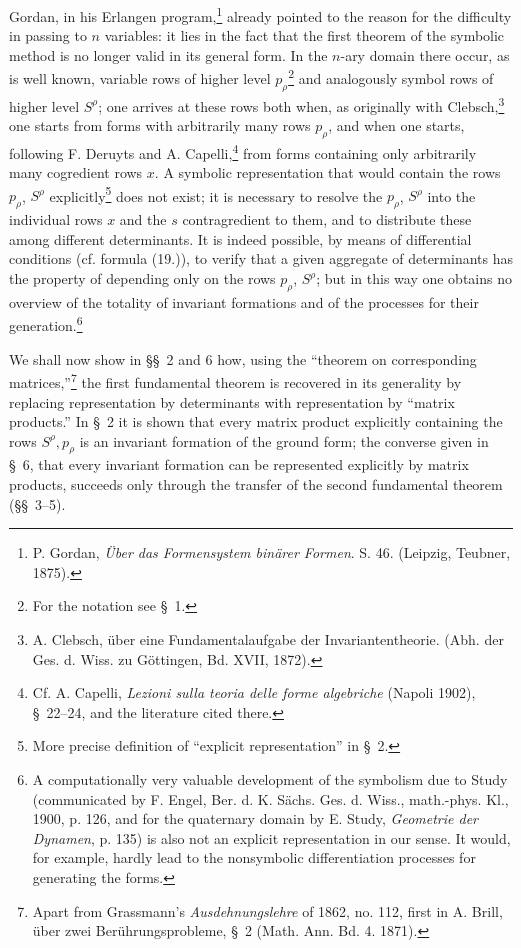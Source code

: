 \documentclass[11pt]{article}
\begin{document}
Gordan, in his Erlangen program,\footnote{P. Gordan, \emph{Über das Formensystem binärer Formen}. S. 46. (Leipzig, Teubner, 1875).} already pointed to the reason for the difficulty in passing to $n$ variables: it lies in the fact that the first theorem of the symbolic method is no longer valid in its general form. In the $n$-ary domain there occur, as is well known, variable rows of higher level $p_\rho$\footnote{For the notation see \S\ 1.} and analogously symbol rows of higher level $S^\rho$; one arrives at these rows both when, as originally with Clebsch,\footnote{A. Clebsch, über eine Fundamentalaufgabe der Invariantentheorie. (Abh. der Ges. d. Wiss. zu Göttingen, Bd. XVII, 1872).} one starts from forms with arbitrarily many rows $p_\rho$, and when one starts, following F. Deruyts and A. Capelli,\footnote{Cf. A. Capelli, \emph{Lezioni sulla teoria delle forme algebriche} (Napoli 1902), \S\ 22--24, and the literature cited there.} from forms containing only arbitrarily many cogredient rows $x$. A symbolic representation that would contain the rows $p_\rho$, $S^\rho$ explicitly\footnote{More precise definition of ``explicit representation'' in \S\ 2.} does not exist; it is necessary to resolve the $p_\rho$, $S^\rho$ into the individual rows $x$ and the $s$ contragredient to them, and to distribute these among different determinants. It is indeed possible, by means of differential conditions (cf. formula (19.)), to verify that a given aggregate of determinants has the property of depending only on the rows $p_\rho$, $S^\rho$; but in this way one obtains no overview of the totality of invariant formations and of the processes for their generation.\footnote{A computationally very valuable development of the symbolism due to Study (communicated by F. Engel, Ber. d. K. Sächs. Ges. d. Wiss., math.-phys. Kl., 1900, p. 126, and for the quaternary domain by E. Study, \emph{Geometrie der Dynamen}, p. 135) is also not an explicit representation in our sense. It would, for example, hardly lead to the nonsymbolic differentiation processes for generating the forms.}

We shall now show in \S\S\ 2 and 6 how, using the ``theorem on corresponding matrices,''\footnote{Apart from Grassmann's \emph{Ausdehnungslehre} of 1862, no. 112, first in A. Brill, über zwei Berührungsprobleme, \S\ 2 (Math. Ann. Bd. 4. 1871).} the first fundamental theorem is recovered in its generality by replacing representation by determinants with representation by ``matrix products.'' In \S\ 2 it is shown that every matrix product explicitly containing the rows $S^\rho,p_\rho$ is an invariant formation of the ground form; the converse given in \S\ 6, that every invariant formation can be represented explicitly by matrix products, succeeds only through the transfer of the second fundamental theorem (\S\S\ 3--5).
\end{document}
